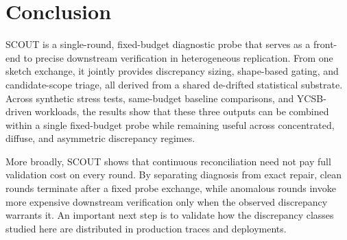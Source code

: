 \section{Conclusion}
\label{sec:conclusion}

SCOUT is a single-round, fixed-budget diagnostic probe that
serves as a front-end to precise downstream verification in
heterogeneous replication. From one sketch exchange, it
jointly provides discrepancy sizing, shape-based gating, and
candidate-scope triage, all derived from a shared
de-drifted statistical substrate. Across synthetic stress
tests, same-budget baseline comparisons, and YCSB-driven
workloads, the results show that these three outputs can be
combined within a single fixed-budget probe while remaining
useful across concentrated, diffuse, and asymmetric
discrepancy regimes.

More broadly, SCOUT shows that continuous reconciliation need
not pay full validation cost on every round. By separating
diagnosis from exact repair, clean rounds terminate after a
fixed probe exchange, while anomalous rounds invoke more
expensive downstream verification only when the observed
discrepancy warrants it. An important next step is to
validate how the discrepancy classes studied here are
distributed in production traces and deployments.
